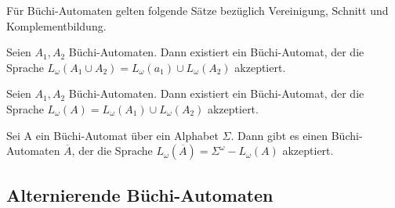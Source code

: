 Für Büchi-Automaten gelten folgende Sätze bezüglich Vereinigung, Schnitt und Komplementbildung. 

\begin{satz}\cite{choueka74}
Seien $A_1, A_2$ Büchi-Automaten. Dann existiert ein Büchi-Automat, der die Sprache $L_{\omega}(A_1\cup A_2)=L_{\omega}(a_1)\cup L_{\omega}(A_2)$ akzeptiert.
\end{satz}
\begin{satz}\cite{choueka74}
Seien $A_1, A_2$ Büchi-Automaten. Dann existiert ein Büchi-Automat, der die Sprache $L_{\omega}(A)=L_{\omega}(A_1)\cup L_{\omega}(A_2)$ akzeptiert.
\end{satz}
\begin{satz}\cite{buechi62}
Sei A ein Büchi-Automat über ein Alphabet $\Sigma$. Dann gibt es einen Büchi-Automaten $\overline{A}$, der die Sprache $L_\omega(\overline{A})=\Sigma^\omega - L_\omega(A)$ akzeptiert.
\end{satz}


\subsection{Alternierende Büchi-Automaten}


